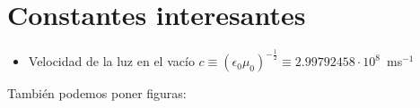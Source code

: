 \chapter{Constantes interesantes}
\graphicspath{{figuras/apend1/}}
\label{cap:apend1}

\begin{itemize}

\item Velocidad de la luz en el vacío  $c \equiv (\epsilon_{0}\mu_{0})^{-\frac{1}{2}} \equiv 2.99792458\cdot 10^{8}$~ms$^{-1}$

\end{itemize}

También podemos poner figuras:


